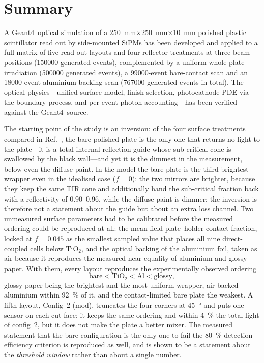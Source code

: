 \documentclass[11pt,a4paper]{article}
\newcommand{\gfour}{Geant4}
\begin{document}
\section{Summary}
\label{sec:summary}

A \gfour\ optical simulation of a
\SI{250}{\milli\meter}$\times$\SI{250}{\milli\meter}$\times$\SI{10}{\milli\meter}
polished plastic scintillator read out by side-mounted SiPMs has been developed
and applied to a full matrix of five read-out layouts and four reflector
treatments at three beam positions (\num{150000} generated events), complemented
by a uniform whole-plate irradiation (\num{500000} generated events), a
\num{99000}-event bare-contact scan and an \num{18000}-event aluminium-backing
scan (\num{767000} generated events in total). The optical physics---unified surface model, finish selection,
photocathode PDE via the boundary process, and per-event photon
accounting---has been verified against the \gfour\ source.

The starting point of the study is an inversion: of the four surface treatments
compared in Ref.~\cite{Rao2025}, the bare polished plate is the only one that
returns no light to the plate---it is a total-internal-reflection guide whose
sub-critical cone is swallowed by the black wall---and yet it is the dimmest in
the measurement, below even the diffuse paint. In the model the bare plate is
the third-brightest wrapper even in the idealised case ($f=0$): the two
mirrors are brighter, because they keep the same TIR cone and additionally
hand the sub-critical
fraction back with a reflectivity of \num{0.90}--\num{0.96}, while the diffuse
paint is dimmer; the inversion is
therefore not a statement about the guide but about an extra loss channel. Two
unmeasured surface parameters had to be calibrated before the measured
ordering could be reproduced at all: the mean-field plate--holder contact
fraction, locked at $f=\num{0.045}$ as the smallest sampled value that places
all nine direct-coupled cells below TiO$_2$, and the optical backing of the
aluminium foil, taken as air because it reproduces the measured near-equality
of aluminium and glossy paper. With them, every layout reproduces the
experimentally observed ordering
\[
  \text{bare} < \text{TiO}_2 < \text{Al} < \text{glossy},
\]
glossy paper being the brightest and the most uniform wrapper, air-backed
aluminium within \SI{92}{\percent} of it, and the contact-limited bare plate
the weakest. A fifth layout, Config~2 (mod), truncates the four corners at
\SI{45}{\degree} and puts one sensor on each cut face; it keeps the same
ordering and within \SI{4}{\percent} the total light of config~2, but it does
not make the plate a better mixer. The measured statement that the bare
configuration is the only one to fail the \SI{80}{\percent}
detection-efficiency criterion is reproduced as well, and is shown to be a
statement about the \emph{threshold window} rather than about a single number.
\end{document}
